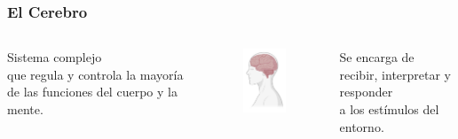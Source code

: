 \documentclass[
11pt, %
%
aspectratio=169, %
]{beamer}
\begin{document}
      \begin{frame}
     	\frametitle{El Cerebro}
     	
     	\begin{columns}[c] %
     		\begin{column}{0.3\textwidth} %
     			\centering
     		Sistema complejo\\
     		que regula y controla la mayor\'ia
     		de las funciones del cuerpo y la mente.
     			
     			
     		\end{column}
     		
     		\begin{column}{0.3\textwidth}
       		\begin{figure}
     			\centering
     			\includegraphics[scale=0.7]{Graphics/female_brain}
     		\end{figure}
     		\end{column}
     		
     		\begin{column}{0.3\textwidth} %
     			\centering
     			Se encarga de recibir, interpretar y responder \\
     			a los est\'imulos del entorno.     			
     			
     		\end{column}
     	\end{columns} 	
        	
     	
     \end{frame}
 
\end{document}
